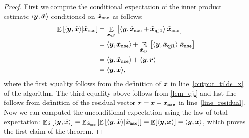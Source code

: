\documentclass[11pt]{article}
\begin{document}
\begin{proof}
First we compute the conditional expectation of the inner product estimate $\langle {\bm y}, \tilde{{\bm x}} \rangle$ conditioned on $\tilde{{\bm x}}_{\tt mse}$ as follows:
\begin{align*}
    \mathop{{\mathbb{E}}} \left[ \langle {\bm y}, \tilde{{\bm x}} \rangle | \tilde{{\bm x}}_{\tt mse} \right] &= \mathop{{\mathbb{E}}}_{\tilde{{\bm x}}_{\tt qjl}} \left[ \langle {\bm y}, \tilde{{\bm x}}_{\tt mse} + \tilde{{\bm x}}_{\tt qjl} \rangle | \tilde{{\bm x}}_{\tt mse} \right]\\
    &= \langle {\bm y}, \tilde{{\bm x}}_{\tt mse} \rangle + \mathop{{\mathbb{E}}}_{\tilde{{\bm x}}_{\tt qjl}} \left[ \langle {\bm y}, \tilde{{\bm x}}_{\tt qjl} \rangle | \tilde{{\bm x}}_{\tt mse} \right] \\
    &= \langle {\bm y}, \tilde{{\bm x}}_{\tt mse} \rangle + \langle {\bm y} , {\bm r} \rangle\\
    &= \langle {\bm y} , {\bm x} \rangle,
\end{align*}
where the first equality follows from the definition of $\tilde{{\bm x}}$ in line~\ref{output_tilde_x} of the algorithm.
The third equality above follows from \cref{lem_qjl} and last line follows from definition of the residual vector ${\bm r} = {\bm x} - \tilde{{\bm x}}_{\tt mse}$ in line~\ref{line_residual}.
Now we can computed the unconditional expectation using the law of total expectation:
$\mathop{{\mathbb{E}}}_{\tilde{{\bm x}}}\left[ \left< {\bm y}, \tilde{{\bm x}} \right> \right] = \mathop{{\mathbb{E}}}_{\tilde{{\bm x}}_{\tt mse}} \left[\mathop{{\mathbb{E}}} \left[ \langle {\bm y}, \tilde{{\bm x}} \rangle | \tilde{{\bm x}}_{\tt mse} \right] \right] = \mathop{{\mathbb{E}}}[\langle {\bm y} , {\bm x} \rangle] = \langle {\bm y} , {\bm x} \rangle$, which proves the first claim of the theorem.


\end{proof}
\end{document}
